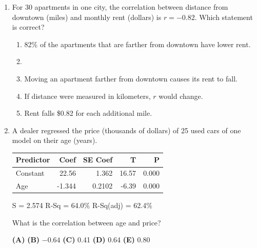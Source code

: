 \documentclass[12pt]{article}
\begin{document}
\begin{enumerate}[leftmargin=1.9em, itemsep=0.13in]
  \boxguard[11]
  \item For 30 apartments in one city, the correlation between distance from downtown (miles)
        and monthly rent (dollars) is $r = -0.82$. Which statement is correct?
        \begin{enumerate}[label=\textbf{(\Alph*)}, leftmargin=2.2em, itemsep=2pt]
          \item 82\% of the apartments that are farther from downtown have lower rent.
          \item {}
          \item Moving an apartment farther from downtown causes its rent to fall.
          \item If distance were measured in kilometers, $r$ would change.
          \item Rent falls \$0.82 for each additional mile.\hfill{}\rule[-0.2in]{0pt}{0.48in}
        \end{enumerate}

  \boxguard[11]
  \item A dealer regressed the price (thousands of dollars) of 25 used cars of one model on
        their age (years).

        \vspace{2pt}
        {\centering\footnotesize\ttfamily
        \begin{tabular}{@{} l r r r r @{}}
        Predictor & Coef & SE Coef & T & P \\ \hline
        Constant & 22.56 & 1.362 & 16.57 & 0.000 \\
        Age & -1.344 & 0.2102 & -6.39 & 0.000 \\
        \end{tabular}\par
        S = 2.574 \quad R-Sq = 64.0\% \quad R-Sq(adj) = 62.4\%\par}
        \vspace{2pt}

        What is the correlation between age and price?\hfill{}\rule[-0.2in]{0pt}{0.48in}
        \par\vspace{3pt}\noindent
        \hspace{1.2em}\textbf{(A)}  \hfill \textbf{(B)} $-0.64$ \hfill
        \textbf{(C)} 0.41 \hfill \textbf{(D)} 0.64 \hfill \textbf{(E)} 0.80


\end{enumerate}
\end{document}
